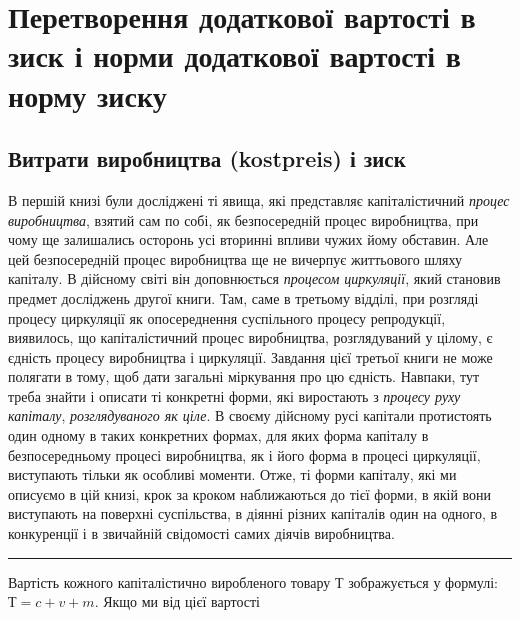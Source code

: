 

\chapter{Перетворення додаткової вартості в зиск і норми додаткової вартості в норму зиску}

\section{Витрати виробництва (kostpreis) і зиск}

В першій книзі були досліджені ті явища, які представляє капіталістичний
\emph{процес виробництва}, взятий сам по собі, як безпосередній
процес виробництва, при чому ще залишались осторонь
усі вторинні впливи чужих йому обставин. Але цей безпосередній
процес виробництва ще не вичерпує життьового шляху капіталу.
В дійсному світі він доповнюється \emph{процесом циркуляції},
який становив предмет досліджень другої книги. Там, саме в
третьому відділі, при розгляді процесу циркуляції як опосереднення
суспільного процесу репродукції, виявилось, що капіталістичний
процес виробництва, розглядуваний у цілому, є єдність
процесу виробництва і циркуляції. Завдання цієї третьої книги
не може полягати в тому, щоб дати загальні міркування про цю
єдність. Навпаки, тут треба знайти і описати ті конкретні форми,
які виростають з \emph{процесу руху капіталу}, \emph{розглядуваного як
ціле}. В своєму дійсному русі капітали протистоять один одному
в таких конкретних формах, для яких форма капіталу в безпосередньому
процесі виробництва, як і його форма в процесі циркуляції,
виступають тільки як особливі моменти. Отже, ті форми
капіталу, які ми описуємо в цій книзі, крок за кроком наближаються
до тієї форми, в якій вони виступають на поверхні
суспільства, в діянні різних капіталів один на одного, в конкуренції
і в звичайній свідомості самих діячів виробництва.

\pfbreak

Вартість кожного капіталістично виробленого товару $Т$ зображується
у формулі: $Т = c + v + m$. Якщо ми від цієї вартості
\parbreak{}  %
